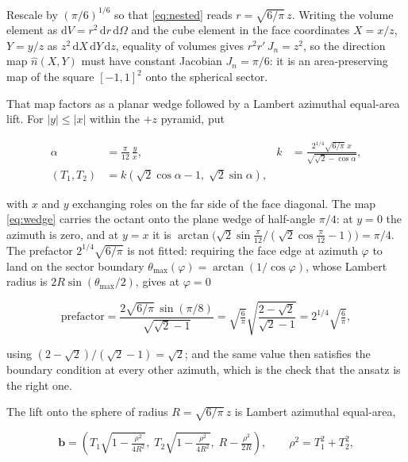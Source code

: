 \medskip

Rescale by \((\pi/6)^{1/6}\) so that \eqref{eq:nested} reads \(r = \sqrt{6/\pi}\,z\). Writing
the volume element as \(\mathrm{d}V = r^{2}\,\mathrm{d}r\,\mathrm{d}\Omega\) and the cube
element in the face coordinates \(X = x/z\), \(Y = y/z\) as \(z^{2}\,\mathrm{d}X\,\mathrm{d}Y
\,\mathrm{d}z\), equality of volumes gives \(r^{2}r'\,J_{n} = z^{2}\), so the direction map
\(\hat{n}(X,Y)\) must have constant Jacobian \(J_{n} = \pi/6\): it is an area-preserving map
of the square \([-1,1]^{2}\) onto the spherical sector.

That map factors as a planar wedge followed by a Lambert azimuthal equal-area lift. For
\(|y| \le |x|\) within the \(+z\) pyramid, put

\begin{align}
  \alpha &= \frac{\pi}{12}\,\frac{y}{x}, &
  k &= \frac{2^{1/4}\sqrt{6/\pi}\;x}{\sqrt{\sqrt{2}-\cos\alpha}}, \\
  (T_{1}, T_{2}) &= k\left(\sqrt{2}\cos\alpha - 1,\; \sqrt{2}\sin\alpha\right),
  \label{eq:wedge}
\end{align}

with \(x\) and \(y\) exchanging roles on the far side of the face diagonal. The map
\eqref{eq:wedge} carries the octant onto the plane wedge of half-angle \(\pi/4\): at
\(y = 0\) the azimuth is zero, and at \(y = x\) it is
\(\arctan\!\big(\sqrt{2}\sin\tfrac{\pi}{12} / (\sqrt{2}\cos\tfrac{\pi}{12}-1)\big) = \pi/4\).
The prefactor \(2^{1/4}\sqrt{6/\pi}\) is not fitted: requiring the face edge at azimuth
\(\varphi\) to land on the sector boundary \(\theta_{\max}(\varphi) = \arctan(1/\cos\varphi)\),
whose Lambert radius is \(2R\sin(\theta_{\max}/2)\), gives at \(\varphi = 0\)

\begin{equation}
  \text{prefactor}
  = \frac{2\sqrt{6/\pi}\,\sin(\pi/8)}{\sqrt{\sqrt{2}-1}}
  = \sqrt{\tfrac{6}{\pi}}\sqrt{\frac{2-\sqrt{2}}{\sqrt{2}-1}}
  = 2^{1/4}\sqrt{\tfrac{6}{\pi}},
\end{equation}

using \((2-\sqrt{2})/(\sqrt{2}-1) = \sqrt{2}\); and the same value then satisfies the boundary
condition at every other azimuth, which is the check that the ansatz is the right one.

The lift onto the sphere of radius \(R = \sqrt{6/\pi}\,z\) is Lambert azimuthal equal-area,

\begin{equation}
  \mathbf{b} = \left(T_{1}\sqrt{1 - \tfrac{\rho^{2}}{4R^{2}}},\;
                     T_{2}\sqrt{1 - \tfrac{\rho^{2}}{4R^{2}}},\;
                     R - \tfrac{\rho^{2}}{2R}\right),
  \qquad \rho^{2} = T_{1}^{2}+T_{2}^{2},
  \label{eq:lambert}
\end{equation}


